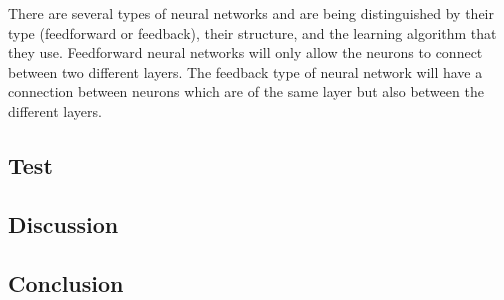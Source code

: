 There are several types of neural networks and are being distinguished by their type (feedforward or feedback), their structure, and the learning algorithm that they use.
Feedforward neural networks will only allow the neurons to connect between two different layers. The feedback type of neural network will have a connection between neurons which are of the same layer but also between the different layers.

\subsection{Test}


\subsection{Discussion}

\subsection{Conclusion}